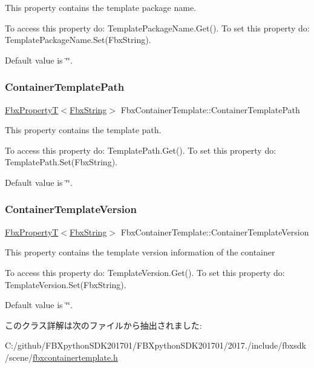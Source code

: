 This property contains the template package name.

To access this property do\+: Template\+Package\+Name.\+Get(). To set this property do\+: Template\+Package\+Name.\+Set(\+Fbx\+String).

Default value is \char`\"{}\char`\"{}. \mbox{\label{class_fbx_container_template_a6377f5a818df77faf04a001ae7a22cca}} 
\subsubsection{\texorpdfstring{Container\+Template\+Path}{ContainerTemplatePath}}
{\footnotesize\ttfamily \hyperlink{class_fbx_property_t}{Fbx\+PropertyT}$<$\hyperlink{class_fbx_string}{Fbx\+String}$>$ Fbx\+Container\+Template\+::\+Container\+Template\+Path}

This property contains the template path.

To access this property do\+: Template\+Path.\+Get(). To set this property do\+: Template\+Path.\+Set(\+Fbx\+String).

Default value is \char`\"{}\char`\"{}. \mbox{\label{class_fbx_container_template_ac2029d97e3946bc2a62f2a673a1981c0}} 
\subsubsection{\texorpdfstring{Container\+Template\+Version}{ContainerTemplateVersion}}
{\footnotesize\ttfamily \hyperlink{class_fbx_property_t}{Fbx\+PropertyT}$<$\hyperlink{class_fbx_string}{Fbx\+String}$>$ Fbx\+Container\+Template\+::\+Container\+Template\+Version}

This property contains the template version information of the container

To access this property do\+: Template\+Version.\+Get(). To set this property do\+: Template\+Version.\+Set(\+Fbx\+String).

Default value is \char`\"{}\char`\"{}. 

このクラス詳解は次のファイルから抽出されました\+:\begin{DoxyCompactItemize}
\item 
C\+:/github/\+F\+B\+Xpython\+S\+D\+K201701/\+F\+B\+Xpython\+S\+D\+K201701/2017./include/fbxsdk/scene/\hyperlink{fbxcontainertemplate_8h}{fbxcontainertemplate.\+h}\end{DoxyCompactItemize}
